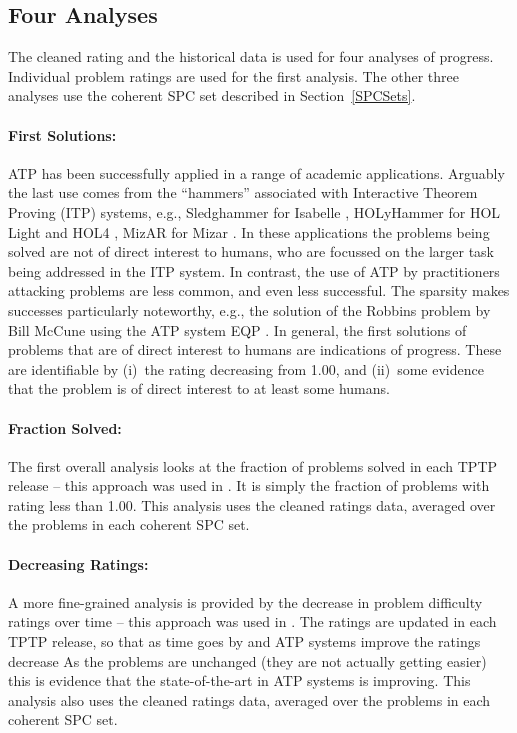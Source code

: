 \documentclass[runningheads]{llncs}
\begin{document}
\subsection{Four Analyses}
\label{AnalysisTypes}

The cleaned rating and the historical data is used for four analyses of progress.
Individual problem ratings are used for the first analysis.
The other three analyses use the coherent SPC set described in Section~\ref{SPCSets}.

\paragraph{First Solutions:}
ATP has been successfully applied in a range of academic applications.
Arguably the last use comes from the ``hammers'' \cite{BK+16} associated with Interactive 
Theorem Proving (ITP) systems, e.g., Sledghammer \cite{PB10} for Isabelle \cite{NPW02}, 
HOLyHammer \cite{KU14} for HOL Light \cite{Har09} and HOL4 \cite{SN08}, 
MizAR \cite{KU15-M40} for Mizar \cite{GKN10}.
In these applications the problems being solved are not of direct interest to humans,
who are focussed on the larger task being addressed in the ITP system.
In contrast, the use of ATP by practitioners attacking problems are less common, and even
less successful.
The sparsity makes successes particularly noteworthy, e.g., the solution of the Robbins
problem by Bill McCune using the ATP system EQP \cite{McC97}.
In general, the first solutions of problems that are of direct interest to humans are
indications of progress.
These are identifiable by (i)~the rating decreasing from 1.00, and (ii)~some evidence that the 
problem is of direct interest to at least some humans.

\paragraph{Fraction Solved:}
The first overall analysis looks at the fraction of problems solved in each TPTP release --
this approach was used in \cite{SSP21}.
It is simply the fraction of problems with rating less than 1.00.
This analysis uses the cleaned ratings data, averaged over the problems in each coherent SPC set.

\paragraph{Decreasing Ratings:}
A more fine-grained analysis is provided by the decrease in problem difficulty ratings over
time -- this approach was used in \cite{SFS01}.
The ratings are updated in each TPTP release, so that as time goes by and ATP systems improve 
the ratings decrease
As the problems are unchanged (they are not actually getting easier) this is evidence that 
the state-of-the-art in ATP systems is improving.
This analysis also uses the cleaned ratings data, averaged over the problems in each coherent 
SPC set.
\end{document}
